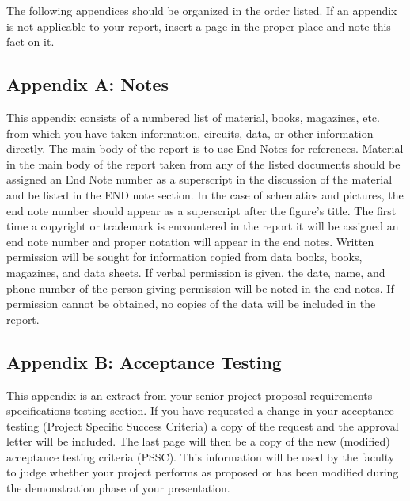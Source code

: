 \documentclass[12pt]{article}
\begin{document}
The following appendices should be organized in the order listed. If an appendix is not applicable to your report, insert a page in the proper place and note this fact on it.

\subsection*{Appendix A: Notes}
This appendix consists of a numbered list of material, books, magazines, etc. from which you have taken information, circuits, data, or other information directly. The main body of the report is to use End Notes for references. Material in the main body of the report taken from any of the listed documents should be assigned an End Note number as a superscript in the discussion of the material and be listed in the END note section. In the case of schematics and pictures, the end note number should appear as a superscript after the figure's title. The first time a copyright or trademark is encountered in the report it
will be assigned an end note number and proper notation will appear in the end notes. Written permission will be sought for information copied from data books, books, magazines, and data sheets. If verbal permission is given, the date, name, and phone number of the person giving permission will be noted in the end notes. If permission cannot be obtained, no copies of the data will be included in the report.

\subsection*{Appendix B: Acceptance Testing}
This appendix is an extract from your senior project proposal requirements specifications testing section. If you have requested a change in your acceptance testing (Project Specific Success Criteria) a copy of the request and the approval letter will be included. The last page will then be a copy of the new (modified) acceptance testing criteria (PSSC). This information will be used by the faculty to judge whether your project performs as proposed or has been modified during the demonstration phase of your presentation.
\end{document}

